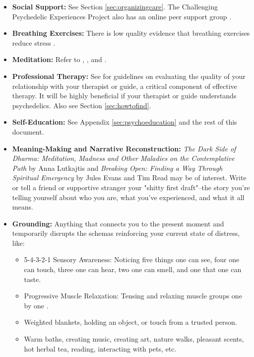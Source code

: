 \documentclass[12pt,letterpaper]{book}
\begin{document}
\begin{itemize}
    \item \textbf{Social Support:} See Section \ref{sec:organizingcare}. The Challenging Psychedelic Experiences Project also has an online peer support group \cite{peersupportgroup}.
    \item \textbf{Breathing Exercises:} There is low quality evidence that breathing exercises reduce stress \cite{fincham2023breathwork}.
    \item \textbf{Meditation:} Refer to \textcite{rain}, \textcite{bodyscan}, and \textcite{lkMeditation}.
    \item \textbf{Professional Therapy:} See \textcite{BRWAIdownload} for guidelines on evaluating the quality of your relationship with your therapist or guide, a critical component of effective therapy. It will be highly beneficial if your therapist or guide understands psychedelics. Also see Section \ref{sec:howtofind}.
    \item \textbf{Self-Education:} See Appendix \ref{sec:psychoeducation} and the rest of this document.
    \item \textbf{Meaning-Making and Narrative Reconstruction:} \textit{The Dark Side of Dharma: Meditation, Madness and Other Maladies on the Contemplative Path} by Anna Lutkajtis \cite{lutkajtis2021dark} and \textit{Breaking Open: Finding a Way Through Spiritual Emergency} by Jules Evans and Tim Read \cite{evans2020} may be of interest. Write or tell a friend or supportive stranger your "shitty first draft"–the story you're telling yourself about who you are, what you've experienced, and what it all means.
    \item \textbf{Grounding:} Anything that connects you to the present moment and temporarily disrupts the schemas reinforcing your current state of distress, like:
    \begin{itemize}
        \item 5-4-3-2-1 Sensory Awareness: Noticing five things one can see, four one can touch, three one can hear, two one can smell, and one that one can taste.
        \item Progressive Muscle Relaxation: Tensing and relaxing muscle groups one by one \cite{michiganProgressive}.
        \item Weighted blankets, holding an object, or touch from a trusted person.
        \item Warm baths, creating music, creating art, nature walks, pleasant scents, hot herbal tea, reading, interacting with pets, etc.

\end{itemize}
\end{itemize}
\end{document}
